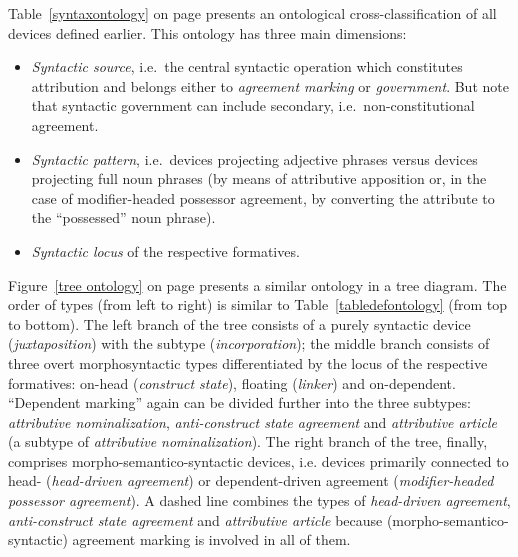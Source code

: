 Table~\ref{syntaxontology} on page \pageref{syntaxontology} presents an ontological cross-classification of all devices defined earlier. This ontology has three main dimensions: 
\begin{itemize}
\item\textit{Syntactic source}, i.e.~the central syntactic operation which constitutes attribution and belongs either to \textit{agreement marking} or \textit{government}. But note that syntactic government can include secondary, i.e.~non-constitutional agreement.
\item\textit{Syntactic pattern}, i.e.~devices projecting adjective phrases versus devices projecting full noun phrases (by means of attributive apposition or, in the case of modifier\hyp{}headed possessor agreement, by converting the attribute to the “possessed” noun phrase).
\item\textit{Syntactic locus} of the respective formatives.
\end{itemize}
Figure~\ref{tree ontology} on page \pageref{tree ontology} presents a similar ontology in a tree diagram. The order of types (from left to right) is similar to Table~\ref{tabledefontology} (from top to bottom). The left branch of the tree consists of a purely syntactic device (\textit{juxtaposition}) with the subtype (\textit{incorporation}); the middle branch consists of three overt morphosyntactic types differentiated by the locus of the respective formatives: on-head (\textit{construct state}), floating (\textit{linker}) and on-dependent. “Dependent marking” again can be divided further into the three subtypes: \textit{attributive nominalization}, \textit{anti\hyp{}construct state agreement} and \textit{attributive article} (a subtype of \textit{attributive nominalization}). The right branch of the tree, finally, comprises morpho-semantico-syntactic devices, i.e. devices primarily connected to head- (\textit{head\hyp{}driven agreement}) or dependent-driven agreement (\textit{modifier\hyp{}headed possessor agreement}). A dashed line combines the types of \textit{head\hyp{}driven agreement}, \textit{anti\hyp{}construct state agreement} and \textit{attributive article} because (morpho-semantico-syntactic) agreement marking is involved in all of them.
